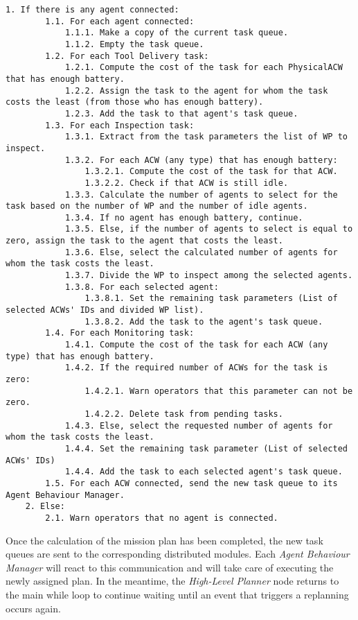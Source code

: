 \begin{lstlisting}[caption={Task planning function's pseudocode}, breaklines=true, label=ps:performTaskAllocation]
	1. If there is any agent connected:
		1.1. For each agent connected:
			1.1.1. Make a copy of the current task queue.
			1.1.2. Empty the task queue.
		1.2. For each Tool Delivery task:
			1.2.1. Compute the cost of the task for each PhysicalACW that has enough battery.
			1.2.2. Assign the task to the agent for whom the task costs the least (from those who has enough battery).
			1.2.3. Add the task to that agent's task queue.
		1.3. For each Inspection task:
			1.3.1. Extract from the task parameters the list of WP to inspect.
			1.3.2. For each ACW (any type) that has enough battery:
				1.3.2.1. Compute the cost of the task for that ACW. 
				1.3.2.2. Check if that ACW is still idle.
			1.3.3. Calculate the number of agents to select for the task based on the number of WP and the number of idle agents.
			1.3.4. If no agent has enough battery, continue.
			1.3.5. Else, if the number of agents to select is equal to zero, assign the task to the agent that costs the least.
			1.3.6. Else, select the calculated number of agents for whom the task costs the least.
			1.3.7. Divide the WP to inspect among the selected agents.
			1.3.8. For each selected agent:
				1.3.8.1. Set the remaining task parameters (List of selected ACWs' IDs and divided WP list).
				1.3.8.2. Add the task to the agent's task queue.
		1.4. For each Monitoring task:
			1.4.1. Compute the cost of the task for each ACW (any type) that has enough battery.
			1.4.2. If the required number of ACWs for the task is zero:
				1.4.2.1. Warn operators that this parameter can not be zero.
				1.4.2.2. Delete task from pending tasks.
			1.4.3. Else, select the requested number of agents for whom the task costs the least.
			1.4.4. Set the remaining task parameter (List of selected ACWs' IDs)
			1.4.4. Add the task to each selected agent's task queue.
		1.5. For each ACW connected, send the new task queue to its Agent Behaviour Manager.
	2. Else:
		2.1. Warn operators that no agent is connected.
\end{lstlisting}

Once the calculation of the mission plan has been completed, the new task queues are sent to the corresponding distributed modules. Each \emph{Agent Behaviour Manager} will react to this communication and will take care of executing the newly assigned plan. In the meantime, the \emph{High-Level Planner} node returns to the main while loop to continue waiting until an event that triggers a replanning occurs again.

